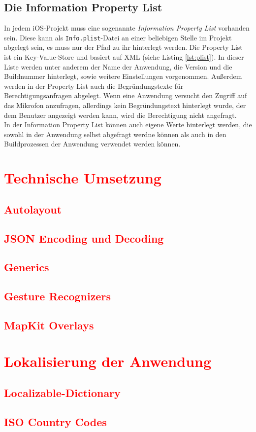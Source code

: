 \subsection{Die Information Property List}
In jedem iOS-Projekt muss eine sogenannte \textit{Information Property List} vorhanden sein.
Diese kann als \texttt{Info.plist}-Datei an einer beliebigen Stelle im Projekt abgelegt sein, es muss nur der Pfad zu ihr hinterlegt werden.
Die Property List ist ein Key-Value-Store und basiert auf XML (siehe Listing \ref{lst:plist}).
In dieser Liste werden unter anderem der Name der Anwendung, die Version und die Buildnummer hinterlegt, sowie weitere Einstellungen vorgenommen.
Außerdem werden in der Property List auch die Begründungstexte für Berechtigungsanfragen abgelegt.
Wenn eine Anwendung versucht den Zugriff auf das Mikrofon anzufragen, allerdings kein Begründungstext hinterlegt wurde, der dem Benutzer angezeigt werden kann, wird die Berechtigung nicht angefragt.
\\
In der Information Property List können auch eigene Werte hinterlegt werden, die sowohl in der Anwendung selbst abgefragt werdne können als auch in den Buildprozessen der Anwendung verwendet werden können.

\section{\textcolor{red}{Technische Umsetzung}}
\label{sec:techimp}
\subsection{\textcolor{red}{Autolayout}}
\subsection{\textcolor{red}{JSON Encoding und Decoding}}
\subsection{\textcolor{red}{Generics}}
\subsection{\textcolor{red}{Gesture Recognizers}}
\subsection{\textcolor{red}{MapKit Overlays}}

\section{\textcolor{red}{Lokalisierung der Anwendung}}
\label{sec:localizing}
\subsection{\textcolor{red}{Localizable-Dictionary}}
\subsection{\textcolor{red}{ISO Country Codes}}
